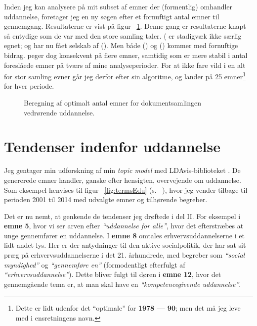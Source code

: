 Inden jeg kan analysere på mit subset af emner der (formentlig) omhandler uddannelse,
foretager jeg en ny søgen efter et fornuftigt antal emner til gennemgang.
Resultaterne er vist på figur ~\ref{fig:modelsEdu}.
Denne gang er resultaterne knapt så entydige som de var med den store samling taler.
\citeauthor{deveaudAccurateEffectiveLatent2014} (\citeyear{deveaudAccurateEffectiveLatent2014} er stadigvæk ikke særlig egnet; og har nu fået selskab af \citeauthor{caojuanDensitybasedMethodAdaptive2009} (\citeyear{caojuanDensitybasedMethodAdaptive2009}).
Men både \citeauthor{arunFindingNaturalNumber2010} (\citeyear{arunFindingNaturalNumber2010}) og \citeauthor{griffithsFindingScientificTopics2004} (\citeyear{griffithsFindingScientificTopics2004}) kommer med fornuftige bidrag.
\citeauthor{arunFindingNaturalNumber2010} peger dog konsekvent på flere emner, samtidig som \citeauthor{griffithsFindingScientificTopics2004} er mere stabil i antal foreslåede emner på tværs af mine analyseperioder.
For at ikke fare vild i en alt for stor samling evner går jeg derfor efter \citeauthor{griffithsFindingScientificTopics2004} sin algoritme, og lander på 25 emner\footnote{Dette er lidt udenfor det “optimale” for \textbf{1978 --- 90}; men det må jeg leve med i ensretningens navn.} for hver periode.

\begin{figure}

\caption{Beregning af optimalt antal emner for dokumentsamlingen vedrørende uddannelse.}
\label{fig:modelsEdu}
\end{figure}

\section{Tendenser indenfor uddannelse}

Jeg gentager min udforskning af min \textit{topic model} med LDAvis-biblioteket \autocite{sievertCpsievertLDAvis2020}.
De genererede emner handler, ganske efter hensigten, overvejende om uddannelse.
Som eksempel henvises til figur ~\ref{fig:termsEdu} (s. ~\pageref{fig:termsEdu}), hvor jeg vender tilbage til perioden 2001 til 2014 med udvalgte emner og tilhørende begreber.

Det er nu nemt, at genkende de tendenser jeg drøftede i del II.
For eksempel i \textbf{emne 5}, hvor vi ser arven efter \textit{“uddannelse for alle”}, hvor det efterstræbes at unge gennemfører en uddannelse.
I \textbf{emne 8} omtales erhvervsuddannelserne i et lidt andet lys.
Her er der antydninger til den aktive socialpolitik, der har sat sit præg på erhvervsuddannelserne i det 21. århundrede, med begreber som \textit{“social myndighed”} og \textit{“gennemføre en”} (formodentligt efterfulgt af \textit{“erhvervsuddannelse”}).
Dette bliver fulgt til døren i \textbf{emne 12}, hvor det gennemgående tema er, at man skal have en \textit{“kompetencegivende uddannelse”}.

